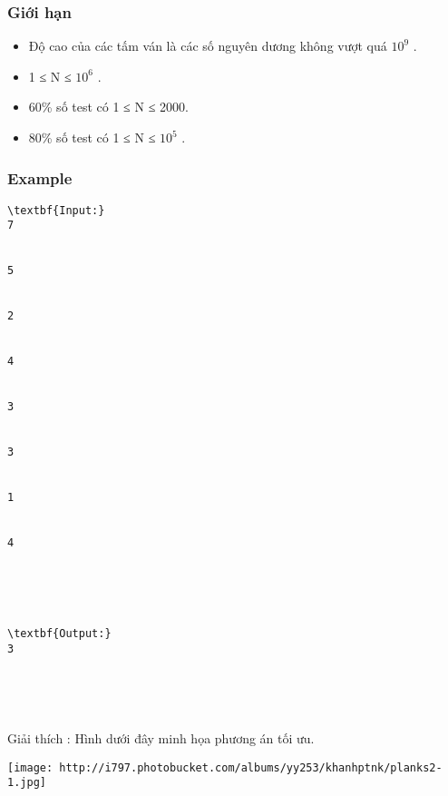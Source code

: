\subsubsection{   Giới hạn  }
\begin{itemize}
	\item     Độ cao của các tấm ván là các số nguyên dương không vượt quá $10^{9}$    .   
	\item     1 ≤ N ≤ $10^{6}$    .   
	\item     60\% số test có 1 ≤ N ≤ 2000.   
	\item     80\% số test có 1 ≤ N ≤ $10^{5}$    .   
\end{itemize}

\subsubsection{   Example  }
\begin{verbatim}
\textbf{Input:}
7


5


2


4


3


3


1


4





\textbf{Output:}
3





\end{verbatim}

Giải thích        : Hình dưới đây minh họa phương án tối ưu.


\texttt{[image: http://i797.photobucket.com/albums/yy253/khanhptnk/planks2-1.jpg]}
